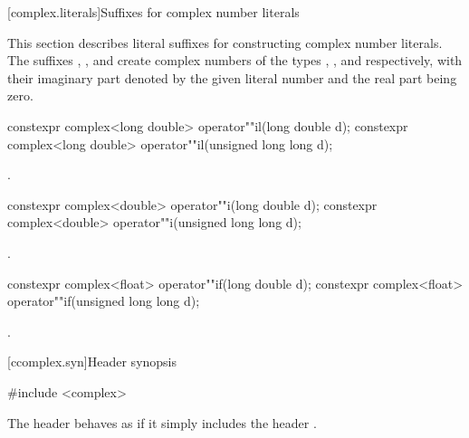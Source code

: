 [complex.literals]{Suffixes for complex number literals}

%
%
\pnum
This section describes literal suffixes for constructing complex number literals.
The suffixes , , and  create complex numbers of
the types , , and
 respectively, with their imaginary part denoted by the
given literal number and the real part being zero.

\begin{itemdecl}
constexpr complex<long double> operator""il(long double d);
constexpr complex<long double> operator""il(unsigned long long d);
\end{itemdecl}

\begin{itemdescr}
\pnum
\returns
{}.
\end{itemdescr}

\begin{itemdecl}
constexpr complex<double> operator""i(long double d);
constexpr complex<double> operator""i(unsigned long long d);
\end{itemdecl}

\begin{itemdescr}
\pnum
\returns
{}.
\end{itemdescr}

\begin{itemdecl}
constexpr complex<float> operator""if(long double d);
constexpr complex<float> operator""if(unsigned long long d);
\end{itemdecl}

\begin{itemdescr}
\pnum
\returns
{}.
\end{itemdescr}

[ccomplex.syn]{Header  synopsis}
%

\begin{codeblock}
#include <complex>
\end{codeblock}

\pnum
The header 
behaves as if it simply includes the header .

